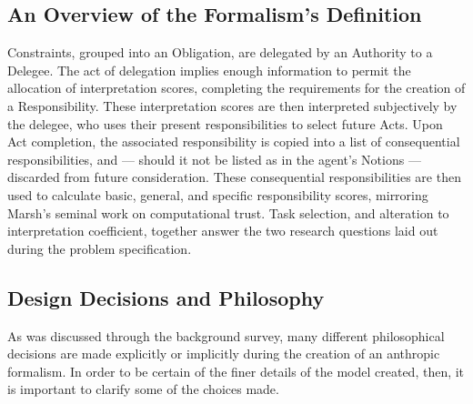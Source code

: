 \subsection{An Overview of the Formalism's Definition}
Constraints, grouped into an Obligation, are delegated by an Authority to a Delegee. The act of delegation implies enough information to permit the allocation of interpretation scores, completing the requirements for the creation of a Responsibility. These interpretation scores are then interpreted subjectively by the delegee, who uses their present responsibilities to select future Acts. Upon Act completion, the associated responsibility is copied into a list of consequential responsibilities, and --- should it not be listed as in the agent's Notions --- discarded from future consideration. These consequential responsibilities are then used to calculate basic, general, and specific responsibility scores, mirroring Marsh's seminal work on computational trust. Task selection, and alteration to interpretation coefficient, together answer the two research questions laid out during the problem specification.\par

\subsection{Design Decisions and Philosophy}\label{subsec:design}
As was discussed through the background survey, many different philosophical decisions are made explicitly or implicitly during the creation of an anthropic formalism. In order to be certain of the finer details of the model created, then, it is important to clarify some of the choices made.\par

